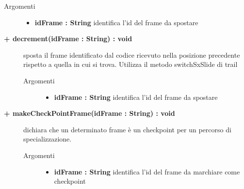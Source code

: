 \begin{description}
\begin{description}
		\begin{description}
			\item[Argomenti] \hfill
				\begin{itemize}
				
					\item \textbf{idFrame : String			} \hfill
						identifica l'id del frame da spostare
					
				\end{itemize}
		\end{description}
	\end{description}
	
	\begin{description}
		\item[\textbf{\color{blue}+ decrement(idFrame : String) : void			}] \hfill
			sposta il frame identificato dal codice ricevuto nella posizione precedente rispetto a quella in cui si trova. Utilizza il metodo switchSxSlide di trail
			
		\begin{description}
			\item[Argomenti] \hfill
				\begin{itemize}
				
					\item \textbf{idFrame : String			} \hfill
						identifica l'id del frame da spostare
					
				\end{itemize}
		\end{description}
	\end{description}
	
	\begin{description}
		\item[\textbf{\color{blue}+ makeCheckPointFrame(idFrame : String) : void			}] \hfill
			dichiara che un determinato frame è un checkpoint per un percorso di specializzazione.
			
		\begin{description}
			\item[Argomenti] \hfill
				\begin{itemize}
				
					\item \textbf{idFrame : String			} \hfill
						identifica l'id del frame da marchiare come checkpoint
					

\end{itemize}
\end{description}
\end{description}
\end{description}
